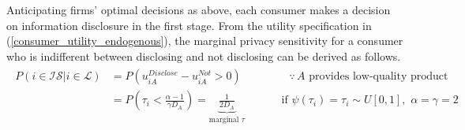 \documentclass[12pt]{article}
\begin{document}

Anticipating firms' optimal decisions as above, each consumer makes a decision on information disclosure in the first stage. From the utility specification in (\ref{consumer_utility_endogenous}), the marginal privacy sensitivity for a consumer who is indifferent between disclosing and not disclosing can be derived as follows.
\begin{align}\label{disclosing prob}
\begin{aligned}
P(i \in \mathcal{IS}|i \in \mathcal{L}) & = P(u_{iA}^{Disclose}-u_{iA}^{Not}>0) \quad\quad\quad\quad\,\, \because \, \text{$A$ provides low-quality product} \\
& =P(\tau_i<\frac{\alpha-1}{\gamma D_A}) = \underbrace{\frac{1}{2 D_A}}_{\text{marginal $\tau$}} \quad\,\,\quad\quad \text{if}\,\,\psi(\tau_i)=\tau_i \sim U[0,1],\,\, \alpha=\gamma=2
\end{aligned}
\end{align} 
\end{document}
